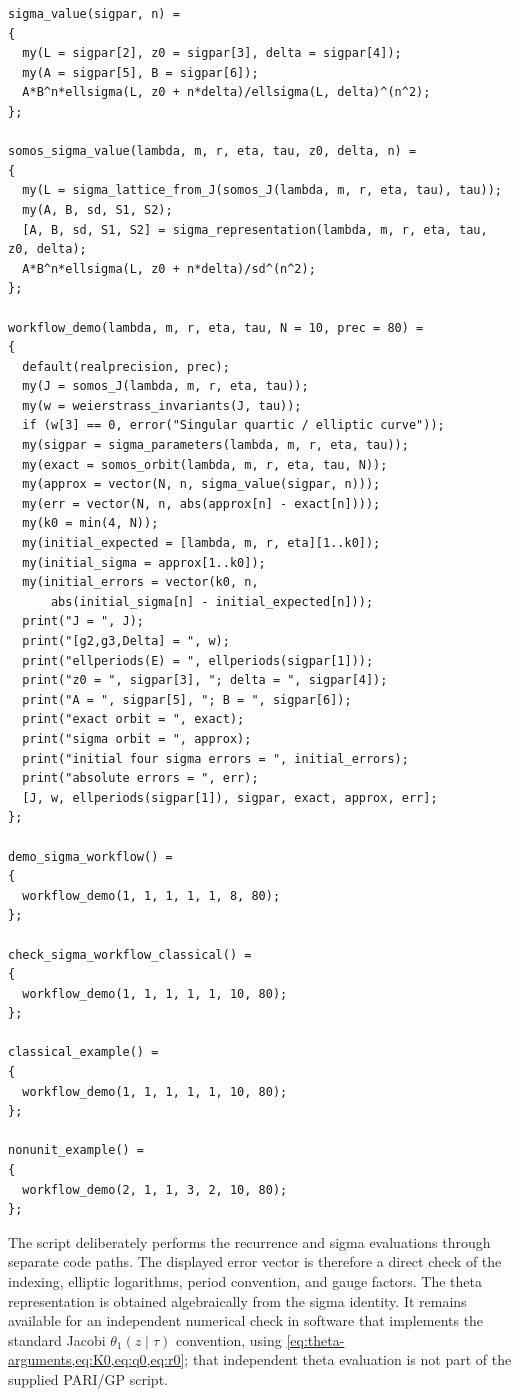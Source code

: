\documentclass[11pt]{article}
\begin{document}
\begin{lstlisting}[style=parigp]
sigma_value(sigpar, n) =
{
  my(L = sigpar[2], z0 = sigpar[3], delta = sigpar[4]);
  my(A = sigpar[5], B = sigpar[6]);
  A*B^n*ellsigma(L, z0 + n*delta)/ellsigma(L, delta)^(n^2);
};

somos_sigma_value(lambda, m, r, eta, tau, z0, delta, n) =
{
  my(L = sigma_lattice_from_J(somos_J(lambda, m, r, eta, tau), tau));
  my(A, B, sd, S1, S2);
  [A, B, sd, S1, S2] = sigma_representation(lambda, m, r, eta, tau, z0, delta);
  A*B^n*ellsigma(L, z0 + n*delta)/sd^(n^2);
};

workflow_demo(lambda, m, r, eta, tau, N = 10, prec = 80) =
{
  default(realprecision, prec);
  my(J = somos_J(lambda, m, r, eta, tau));
  my(w = weierstrass_invariants(J, tau));
  if (w[3] == 0, error("Singular quartic / elliptic curve"));
  my(sigpar = sigma_parameters(lambda, m, r, eta, tau));
  my(exact = somos_orbit(lambda, m, r, eta, tau, N));
  my(approx = vector(N, n, sigma_value(sigpar, n)));
  my(err = vector(N, n, abs(approx[n] - exact[n])));
  my(k0 = min(4, N));
  my(initial_expected = [lambda, m, r, eta][1..k0]);
  my(initial_sigma = approx[1..k0]);
  my(initial_errors = vector(k0, n,
      abs(initial_sigma[n] - initial_expected[n]));
  print("J = ", J);
  print("[g2,g3,Delta] = ", w);
  print("ellperiods(E) = ", ellperiods(sigpar[1]));
  print("z0 = ", sigpar[3], "; delta = ", sigpar[4]);
  print("A = ", sigpar[5], "; B = ", sigpar[6]);
  print("exact orbit = ", exact);
  print("sigma orbit = ", approx);
  print("initial four sigma errors = ", initial_errors);
  print("absolute errors = ", err);
  [J, w, ellperiods(sigpar[1]), sigpar, exact, approx, err];
};

demo_sigma_workflow() =
{
  workflow_demo(1, 1, 1, 1, 1, 8, 80);
};

check_sigma_workflow_classical() =
{
  workflow_demo(1, 1, 1, 1, 1, 10, 80);
};

classical_example() =
{
  workflow_demo(1, 1, 1, 1, 1, 10, 80);
};

nonunit_example() =
{
  workflow_demo(2, 1, 1, 3, 2, 10, 80);
};
\end{lstlisting}

The script deliberately performs the recurrence and sigma evaluations through
separate code paths. The displayed error vector is therefore a direct check
of the indexing, elliptic logarithms, period convention, and gauge factors.
The theta representation is obtained algebraically from the sigma identity.
It remains available for an independent numerical check in software that
implements the standard Jacobi $\theta_1(z\mid\tau)$ convention, using
\cref{eq:theta-arguments,eq:K0,eq:q0,eq:r0}; that independent theta evaluation
is not part of the supplied PARI/GP script.
\end{document}

